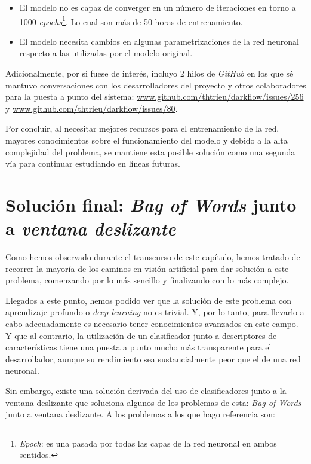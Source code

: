 \begin{itemize}
	\item El modelo no es capaz de converger en un número de iteraciones en torno a 1000 \textit{epochs}\footnote{\textit{Epoch}: es una pasada por todas las capas de la red neuronal en ambos sentidos.}. Lo cual son más de 50 horas de entrenamiento.
	\item El modelo necesita cambios en algunas parametrizaciones de la red neuronal respecto a las utilizadas por el modelo original.
\end{itemize}

Adicionalmente, por si fuese de interés, incluyo 2 hilos de \textit{GitHub} en los que sé mantuvo conversaciones con los desarrolladores del proyecto y otros colaboradores para la puesta a punto del sistema: \url{www.github.com/thtrieu/darkflow/issues/256} y \url{www.github.com/thtrieu/darkflow/issues/80}.

Por concluir, al necesitar mejores recursos para el entrenamiento de la red, mayores conocimientos sobre el funcionamiento del modelo y debido a la alta complejidad del problema, se mantiene esta posible solución como una segunda vía para continuar estudiando en líneas futuras.

\section{Solución final: \textit{Bag of Words} junto  a \textit{ventana deslizante}}

Como hemos observado durante el transcurso de este capítulo, hemos tratado de recorrer la mayoría de los caminos en visión artificial para dar solución a este problema, comenzando por lo más sencillo y finalizando con lo más complejo.

Llegados a este punto, hemos podido ver que la solución de este problema con aprendizaje profundo o \textit{deep learning} no es trivial. Y, por lo tanto, para llevarlo a cabo adecuadamente es necesario tener conocimientos avanzados en este campo. Y que al contrario, la utilización de un clasificador junto a descriptores de características tiene una puesta a punto mucho más transparente para el desarrollador, aunque su rendimiento sea sustancialmente peor que el de una red neuronal.

Sin embargo, existe una solución derivada del uso de clasificadores junto a la ventana deslizante que soluciona algunos de los problemas de esta: \textit{Bag of Words} junto a ventana deslizante. A los problemas a los que hago referencia son:

